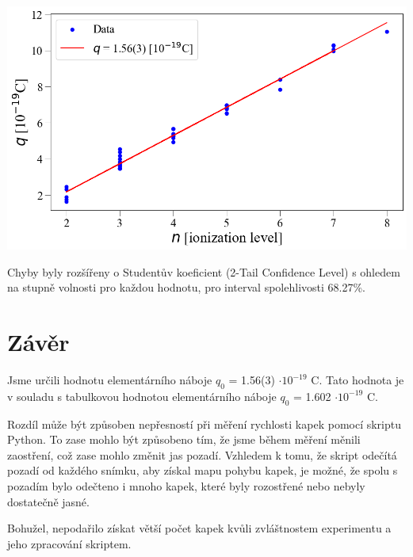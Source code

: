 \documentclass[a4paper,11pt]{article}
\begin{document}
    \hspace{10pt}
    \begin{minipage}[t]{0.5\textwidth} 
            \vspace{10pt}           
            \par \centering
            \includegraphics[scale=0.35]{q}
            \captionsetup{justification=centering, font=footnotesize}
            \label{fig:q}
            \vspace{10pt}
            \raggedright 
            
            \par Chyby byly rozšířeny o Studentův koeficient (2-Tail Confidence Level) s ohledem na stupně volnosti pro každou hodnotu, pro interval spolehlivosti 68.27\%.
        \section{Závěr}  
            Jsme určili hodnotu elementárního náboje $q_0$ = 1.56(3) $\cdot 10^{-19}$ C. Tato hodnota je v souladu s tabulkovou hodnotou elementárního náboje $q_0$ = 1.602 $\cdot 10^{-19}$ C. 
            \par Rozdíl může být způsoben nepřesností při měření rychlosti kapek pomocí skriptu Python. To zase mohlo být způsobeno tím, že jsme během měření měnili zaostření, což zase mohlo změnit jas pozadí. Vzhledem k tomu, že skript odečítá pozadí od každého snímku, aby získal mapu pohybu kapek, je možné, že spolu s pozadím bylo odečteno i mnoho kapek, které byly rozostřené nebo nebyly dostatečně jasné. 
            \par Bohužel, nepodařilo získat větší počet kapek kvůli zvláštnostem experimentu a jeho zpracování skriptem. 
    \end{minipage}
    \vspace{20pt}
\end{document}
